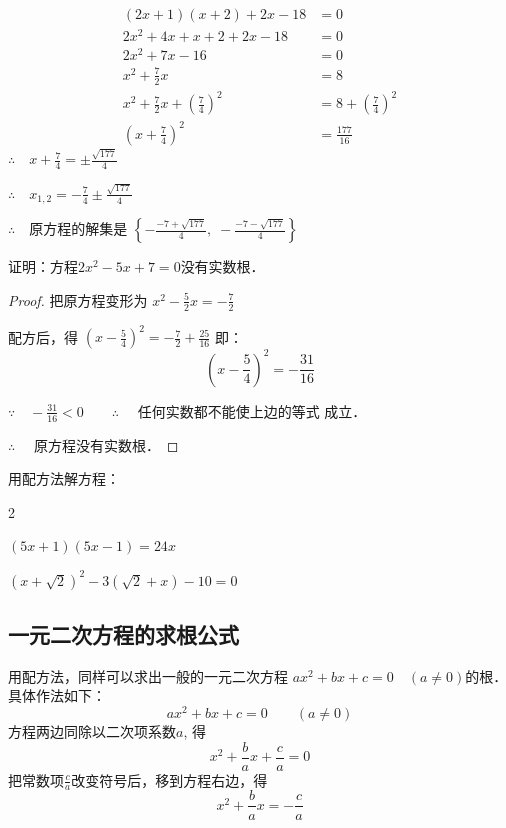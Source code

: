 \begin{solution}
\begin{align*}
    (2x+1)(x+2)+2x-18&=0\\
    2x^2+4x+x+2+2x-18&=0  \tag{去括号}\\
    2x^2+7x-16&=0  \tag{合并}\\
x^2+\frac{7}{2}x&=8  \tag{两边除以2}\\
x^2+\frac{7}{2}x+\left(\frac{7}{4}\right)^2&=8+\left(\frac{7}{4}\right)^2 \tag{配方}\\
\left(x+\frac{7}{4}\right)^2&=\frac{177}{16}
\end{align*}    
$\therefore\quad x+\frac{7}{4}=\pm\frac{\sqrt{177}}{4}$

$\therefore\quad x_{1,2}=-\frac{7}{4}\pm\frac{\sqrt{177}}{4}$

$\therefore\quad $原方程的解集是 $\left\{-\frac{-7+\sqrt{177}}{4},\; -\frac{-7-\sqrt{177}}{4}\right\}$
\end{solution}




\begin{example}
    证明：方程$2x^2-5x+7=0$没有实数根．
\end{example}

\begin{proof}
    把原方程变形为
    $x^2-\frac{5}{2}x=-\frac{7}{2}$

    配方后，得
    $\left(x-\frac{5}{4}\right)^2=-\frac{7}{2}+\frac{25}{16}$
    即：
    \[\left(x-\frac{5}{4}\right)^2=-\frac{31}{16} \]
    
    $\because\quad -\frac{31}{16}<0 \qquad \therefore\quad $
    任何实数都不能使上边的等式
    成立．
    
    $ \therefore\quad $ 原方程没有实数根．
\end{proof}

\begin{ex}
    用配方法解方程：
    \begin{enumerate}
        \begin{multicols}{2}
        \item $(5x+1)(5x-1)=24x$
        \item $(x+\sqrt{2})^2-3(\sqrt{2}+x)-10=0$
        \end{multicols}
    \end{enumerate}
\end{ex}

\subsection{一元二次方程的求根公式}
用配方法，同样可以求出一般的一元二次方程
$ax^2+bx+c=0\quad (a\ne 0)$的根．具体作法如下：
$$ax^2+bx+c=0\qquad (a\ne 0)$$
方程两边同除以二次项系数$a$, 得
$$x^2+\frac{b}{a}x+\frac{c}{a}=0$$
把常数项$\frac{c}{a}$改变符号后，移到方程右边，得
\[x^2+\frac{b}{a}x=-\frac{c}{a}\]

